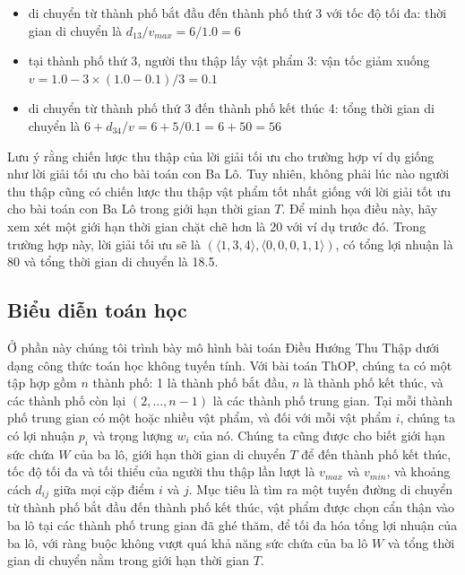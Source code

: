 \begin{itemize}
    \begin{itemize}
        \item di chuyển từ thành phố bắt đầu đến thành phố thứ 3 với tốc độ tối đa: thời gian di chuyển là $d_{13}/v_{max}=6/1.0=6$ 
        \item tại thành phố thứ 3, người thu thập lấy vật phẩm 3: vận tốc giảm xuống $v=1.0-3\times(1.0-0.1)/3=0.1$ 
        \item di chuyển từ thành phố thứ 3 đến thành phố kết thúc 4: tổng thời gian di chuyển là $6+d_{34}/v=6+5/0.1=6+50=56$ 
    \end{itemize}
\end{itemize}

Lưu ý rằng chiến lược thu thập của lời giải tối ưu cho trường hợp ví dụ giống như lời giải tối ưu cho bài toán con Ba Lô. Tuy nhiên, không phải lúc nào người thu thập cũng có chiến lược thu thập vật phẩm tốt nhất giống với lời giải tốt ưu cho bài toán con Ba Lô trong giới hạn thời gian $T$. Để minh họa điều này, hãy xem xét một giới hạn thời gian chặt chẽ hơn là 20 với ví dụ trước đó. Trong trường hợp này, lời giải  tối ưu sẽ là $(\langle1, 3, 4\rangle, \langle0, 0, 0, 1, 1\rangle)$, có tổng lợi nhuận là 80 và tổng thời gian di chuyển là 18.5.
\subsection{Biểu diễn toán học}
Ở phần này chúng tôi trình bày mô hình bài toán Điều Hướng Thu Thập dưới dạng công thức toán học không tuyến tính. Với bài toán ThOP, chúng ta có một tập hợp gồm $n$ thành phố: 1 là thành phố bắt đầu, $n$ là thành phố kết thúc, và các thành phố còn lại $(2, . . . , n - 1)$ là các thành phố trung gian. Tại mỗi thành phố trung gian có một hoặc nhiều vật phẩm, và đối với mỗi vật phẩm $i$, chúng ta có lợi nhuận $p_i$ và trọng lượng $w_i$ của nó. Chúng ta cũng được cho biết giới hạn sức chứa $W$ của ba lô, giới hạn thời gian di chuyển $T$ để đến thành phố kết thúc, tốc độ tối đa và tối thiểu của người thu thập lần lượt là $v_{max}$ và $v_{min}$, và khoảng cách $d_{ij}$ giữa mọi cặp điểm $i$ và $j$. Mục tiêu là tìm ra một tuyến đường di chuyển từ thành phố bắt đầu đến thành phố kết thúc, vật phẩm được chọn cẩn thận vào ba lô tại các thành phố trung gian đã ghé thăm, để tối đa hóa tổng lợi nhuận của ba lô, với ràng buộc không vượt quá khả năng sức chứa của ba lô $W$ và tổng thời gian di chuyển nằm trong giới hạn thời gian $T$.

